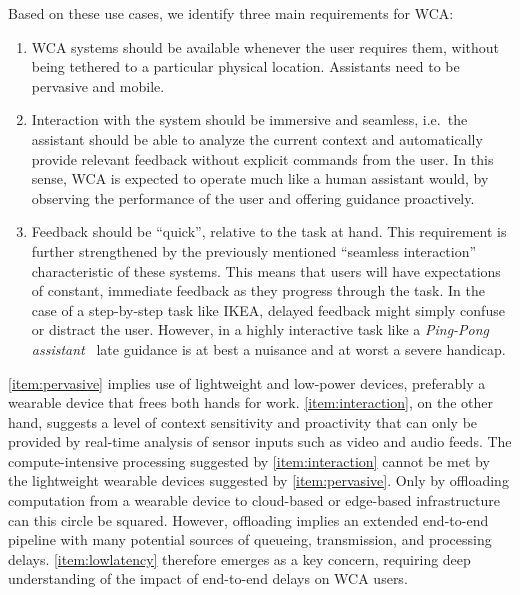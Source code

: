 Based on these use cases, we identify three main requirements for WCA:\@
\begin{enumerate}
    \item\label{item:pervasive} WCA systems should be available whenever the user requires them, without being tethered to a particular physical location. Assistants need to be pervasive and mobile.

    \item\label{item:interaction} Interaction with the system should be immersive and seamless, i.e.\ the assistant should be able to analyze the current context and automatically provide relevant feedback without explicit commands from the user.
    In this sense, WCA is expected to operate much like a human assistant would, by observing the performance of the user and offering guidance proactively.

    \item\label{item:lowlatency} Feedback should be ``quick'', relative to the task at hand. 
    This requirement is further strengthened by the previously mentioned ``seamless interaction'' characteristic of these systems.
    This means that users will have expectations of constant, immediate feedback as they progress through the task.
    In the case of a step-by-step task like IKEA, delayed feedback might simply confuse or distract the user.
    However, in a highly interactive task like a \emph{Ping-Pong assistant}~\cite{PingPongAssistant, Chen:EarlyImplementation} late guidance is at best a nuisance and at worst a severe handicap.
\end{enumerate}

\cref{item:pervasive} implies use of lightweight and low-power devices, preferably a wearable device that frees both hands for work.
\cref{item:interaction}, on the other hand, suggests a level of context sensitivity and proactivity that can only be provided by real-time analysis of sensor inputs such as video and audio feeds.
The compute-intensive processing suggested by \cref{item:interaction} cannot be met by the lightweight wearable devices suggested by \cref{item:pervasive}.
Only by offloading computation from a wearable device to cloud-based or edge-based infrastructure can this circle be squared.
However, offloading implies an extended end-to-end pipeline with many potential sources of queueing, transmission, and processing delays.
\cref{item:lowlatency} therefore emerges as a key concern, requiring deep understanding of the impact of end-to-end delays on WCA users.

